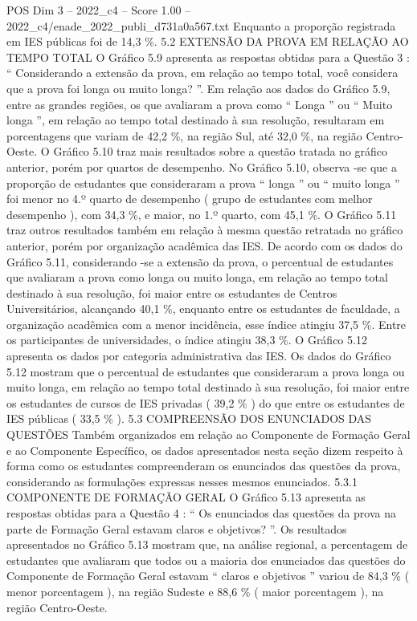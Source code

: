 \begin{textsample}{POS Dim 3 – 2022\_c4 – Score 1.00 – 2022\_c4/enade\_2022\_publi\_d731a0a567.txt}
Enquanto a proporção registrada em IES públicas foi de 14,3 \%. 5.2 EXTENSÃO DA PROVA EM RELAÇÃO AO TEMPO TOTAL O Gráfico 5.9 apresenta as respostas obtidas para a Questão 3 : “ Considerando a extensão da prova, em relação ao tempo total, você considera que a prova foi longa ou muito longa? ”.
Em relação aos dados do Gráfico 5.9, entre as grandes regiões, os que avaliaram a prova como “ Longa ” ou “ Muito longa ”, em relação ao tempo total destinado à sua resolução, resultaram em porcentagens que variam de 42,2 \%, na região Sul, até 32,0 \%, na região Centro-Oeste.
O Gráfico 5.10 traz mais resultados sobre a questão tratada no gráfico anterior, porém por quartos de desempenho.
No Gráfico 5.10, observa -se que a proporção de estudantes que consideraram a prova “ longa ” ou “ muito longa ” foi menor no 4.º quarto de desempenho ( grupo de estudantes com melhor desempenho ), com 34,3 \%, e maior, no 1.º quarto, com 45,1 \%.
O Gráfico 5.11 traz outros resultados também em relação à mesma questão retratada no gráfico anterior, porém por organização acadêmica das IES.
De acordo com os dados do Gráfico 5.11, considerando -se a extensão da prova, o percentual de estudantes que avaliaram a prova como longa ou muito longa, em relação ao tempo total destinado à sua resolução, foi maior entre os estudantes de Centros Universitários, alcançando 40,1 \%, enquanto entre os estudantes de faculdade, a organização acadêmica com a menor incidência, esse índice atingiu 37,5 \%.
Entre os participantes de universidades, o índice atingiu 38,3 \%.
O Gráfico 5.12 apresenta os dados por categoria administrativa das IES.
Os dados do Gráfico 5.12 mostram que o percentual de estudantes que consideraram a prova longa ou muito longa, em relação ao tempo total destinado à sua resolução, foi maior entre os estudantes de cursos de IES privadas ( 39,2 \% ) do que entre os estudantes de IES públicas ( 33,5 \% ). 5.3 COMPREENSÃO DOS ENUNCIADOS DAS QUESTÕES Também organizados em relação ao Componente de Formação Geral e ao Componente Específico, os dados apresentados nesta seção dizem respeito à forma como os estudantes compreenderam os enunciados das questões da prova, considerando as formulações expressas nesses mesmos enunciados. 5.3.1 COMPONENTE DE FORMAÇÃO GERAL O Gráfico 5.13 apresenta as respostas obtidas para a Questão 4 : “ Os enunciados das questões da prova na parte de Formação Geral estavam claros e objetivos? ”.
Os resultados apresentados no Gráfico 5.13 mostram que, na análise regional, a percentagem de estudantes que avaliaram que todos ou a maioria dos enunciados das questões do Componente de Formação Geral estavam “ claros e objetivos ” variou de 84,3 \% ( menor porcentagem ), na região Sudeste e 88,6 \% ( maior porcentagem ), na região Centro-Oeste.

\end{textsample}
